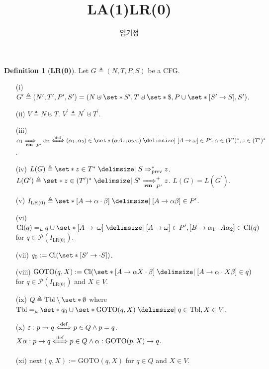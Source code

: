 \documentclass[12pt]{paper}
\title{LA(1)LR(0)}
\author{임기정}
\theoremstyle{definition}
\newtheorem*{definition}{Definition}
\newcommand{\powerset}
{ \mathcal{P} }
\begin{document}
\maketitle

\begin{definition}[\textbf{LR(0)}]
Let $G \triangleq ( N , T , P , S )$ be a CFG.
\begin{enumerate}
\item[(i)] $G^\prime \triangleq ( N^\prime , T^\prime , P^\prime , S^\prime ) = ( N \uplus \set*{ S^\prime } , T \uplus \set*{ \$ } , P \cup \set*{ [ S^\prime \to S ] } , S^\prime )$.
\item[(ii)] $V \triangleq N \uplus T$. $V^\prime \triangleq N^\prime \uplus T^\prime$.
\item[(iii)] $\alpha_1 \xRightarrow[\mathbf{rm}]{}_{P^\prime} \alpha_2 \xLeftrightarrow[]{\mathrm{def}} ( \alpha_1 , \alpha_2 ) \in \set*{ ( \alpha A z , \alpha \omega z ) \mid [ A \to \omega ] \in P^\prime , \alpha \in ( V^\prime )^\ast , z \in ( T^\prime )^\ast }$.
\item[(iv)] $L ( G ) \triangleq \set*{ z \in T^\ast \mid S \Rightarrow_\mathrm{prev}^\ast z }$. $L ( G^\prime ) \triangleq \set*{ z \in ( T^\prime )^\ast \mid S^\prime \xRightarrow[\mathbf{rm}]{}_{P^\prime}^+ z }$. $L ( G ) = L ( G^\prime )$.
\item[(v)] $I_{\text{LR(0)}} \triangleq \set*{ [ A \to \alpha \cdot \beta ] \mid [ A \to \alpha \beta ] \in P^\prime }$.
\item[(vi)] $\mathrm{Cl} ( q ) =_\mu q \cup \set*{ [ A \to \cdot \omega ] \mid [ A \to \omega ] \in P^\prime , [ B \to \alpha_1 \cdot A \alpha_2 ] \in \mathrm{Cl} ( q ) }$ for $ q \in \powerset ( I_{\text{LR(0)}} ) $.
\item[(vii)] $q_0 := \mathrm{Cl} ( \set*{ [ S^\prime \to \cdot S ] } )$.
\item[(viii)] $\mathrm{GOTO} ( q , X ) := \mathrm{Cl} ( \set*{ [ A \to \alpha X \cdot \beta ] \mid [ A \to \alpha \cdot X \beta ] \in q } )$ for $ q \in \powerset ( I_{\text{LR(0)}} ) $ and $ X \in V $.
\item[(ix)] $Q \triangleq \mathrm{Tbl} \setminus \set*{ \emptyset }$ where $\mathrm{Tbl} =_\mu \set*{ q_0 } \cup \set*{ \mathrm{GOTO} ( q , X ) \mid q \in \mathrm{Tbl} , X \in V }$.
\item[(x)] $\varepsilon : p \to q \xLeftrightarrow[]{\mathrm{def}} p \in Q \land p = q$. $X \alpha : p \to q \xLeftrightarrow[]{\mathrm{def}} p \in Q \land \alpha : \mathrm{GOTO} ( p , X ) \to q$.
\item[(xi)] $\mathrm{next} ( q , X ) := \mathrm{GOTO} ( q , X )$ for $q \in Q$ and $X \in V$.

\end{enumerate}
\end{definition}
\end{document}
